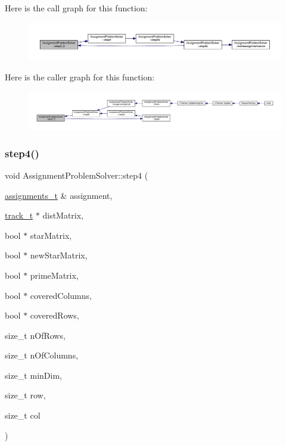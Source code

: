 Here is the call graph for this function\+:\nopagebreak
\begin{figure}[H]
\begin{center}
\leavevmode
\includegraphics[width=350pt]{class_assignment_problem_solver_a8c24dfcfef6adfb96c6394f798c02dba_cgraph}
\end{center}
\end{figure}
Here is the caller graph for this function\+:\nopagebreak
\begin{figure}[H]
\begin{center}
\leavevmode
\includegraphics[width=350pt]{class_assignment_problem_solver_a8c24dfcfef6adfb96c6394f798c02dba_icgraph}
\end{center}
\end{figure}
\mbox{\label{class_assignment_problem_solver_a6ea85d386a136effd84c00f4e2f3cd77}} 
\subsubsection{\texorpdfstring{step4()}{step4()}}
{\footnotesize\ttfamily void Assignment\+Problem\+Solver\+::step4 (\begin{DoxyParamCaption}\item[{\mbox{\hyperlink{_hungarian_alg_8h_ad7b9f569a9adbd958c668a36b6884ffd}{assignments\+\_\+t}} \&}]{assignment,  }\item[{\mbox{\hyperlink{defines_8h_a7ce9c8817b42ab418e61756f579549ab}{track\+\_\+t}} $\ast$}]{dist\+Matrix,  }\item[{bool $\ast$}]{star\+Matrix,  }\item[{bool $\ast$}]{new\+Star\+Matrix,  }\item[{bool $\ast$}]{prime\+Matrix,  }\item[{bool $\ast$}]{covered\+Columns,  }\item[{bool $\ast$}]{covered\+Rows,  }\item[{size\+\_\+t}]{n\+Of\+Rows,  }\item[{size\+\_\+t}]{n\+Of\+Columns,  }\item[{size\+\_\+t}]{min\+Dim,  }\item[{size\+\_\+t}]{row,  }\item[{size\+\_\+t}]{col }\end{DoxyParamCaption})\hspace{0.3cm}{\ttfamily [private]}}



